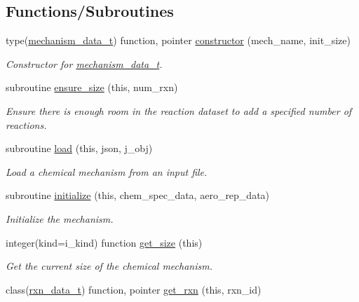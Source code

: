 \subsection*{Functions/\+Subroutines}
\begin{DoxyCompactItemize}
\item 
type(\mbox{\hyperlink{structpmc__mechanism__data_1_1mechanism__data__t}{mechanism\+\_\+data\+\_\+t}}) function, pointer \mbox{\hyperlink{namespacepmc__mechanism__data_a35bbe32d1c1cb03b3add4d988d3f80e6}{constructor}} (mech\+\_\+name, init\+\_\+size)
\begin{DoxyCompactList}\small\item\em Constructor for \mbox{\hyperlink{structpmc__mechanism__data_1_1mechanism__data__t}{mechanism\+\_\+data\+\_\+t}}. \end{DoxyCompactList}\item 
subroutine \mbox{\hyperlink{namespacepmc__mechanism__data_abe6f1501c5d5d66d04993b54b142521f}{ensure\+\_\+size}} (this, num\+\_\+rxn)
\begin{DoxyCompactList}\small\item\em Ensure there is enough room in the reaction dataset to add a specified number of reactions. \end{DoxyCompactList}\item 
subroutine \mbox{\hyperlink{namespacepmc__mechanism__data_a7ada5b071666b6eaf2fde27f8866cbdf}{load}} (this, json, j\+\_\+obj)
\begin{DoxyCompactList}\small\item\em Load a chemical mechanism from an input file. \end{DoxyCompactList}\item 
subroutine \mbox{\hyperlink{namespacepmc__mechanism__data_af37833fbb878f0add05d26cdbaa5cd33}{initialize}} (this, chem\+\_\+spec\+\_\+data, aero\+\_\+rep\+\_\+data)
\begin{DoxyCompactList}\small\item\em Initialize the mechanism. \end{DoxyCompactList}\item 
integer(kind=i\+\_\+kind) function \mbox{\hyperlink{namespacepmc__mechanism__data_ad347eb7b2faed074dd4a83a35f6a3559}{get\+\_\+size}} (this)
\begin{DoxyCompactList}\small\item\em Get the current size of the chemical mechanism. \end{DoxyCompactList}\item 
class(\mbox{\hyperlink{structpmc__rxn__data_1_1rxn__data__t}{rxn\+\_\+data\+\_\+t}}) function, pointer \mbox{\hyperlink{namespacepmc__mechanism__data_af57977440b3989fba90251b16afbb65a}{get\+\_\+rxn}} (this, rxn\+\_\+id)

\end{DoxyCompactItemize}
